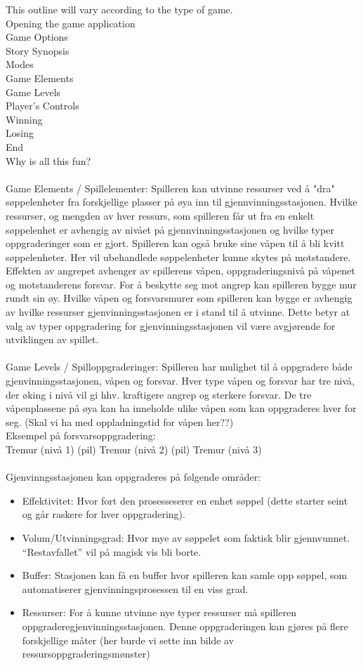 This outline will vary according to the type of game. \\
Opening the game application\\
Game Options \\
Story Synopsis\\
Modes\\
Game Elements\\
Game Levels\\
Player’s Controls\\
Winning\\
Losing\\
End\\
Why is all this fun?\\
\\
Game Elements / Spillelementer: 
Spilleren kan utvinne ressurser ved å "dra" søppelenheter fra forskjellige plasser på øya inn til gjennvinningsstasjonen. Hvilke ressurser, og mengden av hver ressurs, som spilleren får ut fra en enkelt søppelenhet er avhengig av nivået på gjennvinningsstasjonen og hvilke typer oppgraderinger som er gjort. Spilleren kan også bruke sine våpen til å bli kvitt søppelenheter. Her vil ubehandlede søppelenheter kunne skytes på motstandere. Effekten av angrepet avhenger av spillerens våpen, oppgraderingsnivå på våpenet og motstanderens forsvar. For å beskytte seg mot angrep kan spilleren bygge mur rundt sin øy. Hvilke våpen og forsvarsmurer som spilleren kan bygge er avhengig av hvilke ressurser gjenvinningsstasjonen er i stand til å utvinne. Dette betyr at valg av typer oppgradering for gjenvinningsstasjonen vil være avgjørende for utviklingen av spillet.\\
\\
Game Levels / Spilloppgraderinger: 
Spilleren har mulighet til å oppgradere både gjenvinningsstasjonen, våpen og forsvar. Hver type våpen og forsvar har tre nivå, der øking i nivå vil gi hhv. kraftigere angrep og sterkere forsvar. De tre våpenplassene på øya kan ha inneholde ulike våpen som kan oppgraderes hver for seg. (Skal vi ha med oppladningstid for våpen her??)\\
Eksempel på forsvarsoppgradering:\\
Tremur (nivå 1) (pil) Tremur (nivå 2) (pil) Tremur (nivå 3)\\
\\
Gjenvinngsstasjonen kan oppgraderes på følgende områder:\\
\begin{itemize}
	\item Effektivitet: Hvor fort den prosesseserer en enhet søppel (dette starter seint og går raskere for hver oppgradering).
	\item Volum/Utvinningsgrad: Hvor mye av søppelet som faktisk blir gjennvunnet. “Restavfallet” vil på magisk vis bli borte.
	\item Buffer: Stasjonen kan få en buffer hvor spilleren kan samle opp søppel, som automatiserer gjenvinningsprosessen til en viss grad.
	\item Ressurser: For å kunne utvinne nye typer ressurser må spilleren oppgraderegjenvinningsstasjonen. Denne oppgraderingen kan gjøres på flere forskjellige måter (her burde vi sette inn bilde av ressursoppgraderingsmønster)
\end{itemize}

